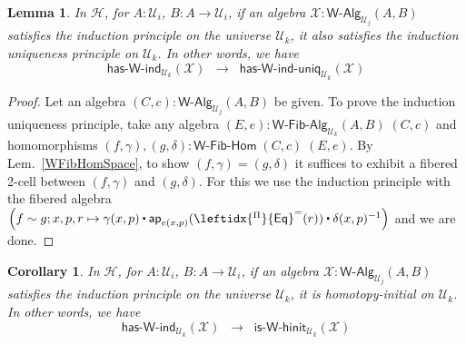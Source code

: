 \documentclass[reqno,10pt,a4paper,oneside]{amsart}
\newcommand{\X}{\mathcal{X}}
\newcommand{\W}{\mathsf{W}}
\newcommand{\funext}{\leftidx{^\Pi}{\mathsf{Eq}}^{=}}
\newcommand{\UU}{\mathcal{U}}
\newcommand{\WAlg}{\mathsf{W}\text{-}\mathsf{Alg}}
\newcommand{\WFibAlg}{\mathsf{W}\text{-}\mathsf{Fib}\text{-}\mathsf{Alg}}
\newcommand{\WFibHom}{\mathsf{W}\text{-}\mathsf{Fib}\text{-}\mathsf{Hom}}
\newcommand{\HasWRec}{\mathsf{has}\text{-}\mathsf{W}\text{-}\mathsf{rec}}
\newcommand{\HasWInd}{\mathsf{has}\text{-}\mathsf{W}\text{-}\mathsf{ind}}
\newcommand{\HasWRecUniq}{\mathsf{has}\text{-}\mathsf{W}\text{-}\mathsf{rec}\text{-}\mathsf{uniq}}
\newcommand{\HasWIndUniq}{\mathsf{has}\text{-}\mathsf{W}\text{-}\mathsf{ind}\text{-}\mathsf{uniq}}
\newcommand{\IsWHInit}{\mathsf{is}\text{-}\mathsf{\W}\text{-}\mathsf{hinit}}
\newcommand{\app}{\mathsf{ap}}
\newcommand{\Hint}{\mathcal{H}}
\newcommand{\ct}{%
  \mathchoice{\mathbin{\raisebox{0.5ex}{$\displaystyle\centerdot$}}}%
             {\mathbin{\raisebox{0.5ex}{$\centerdot$}}}%
             {\mathbin{\raisebox{0.25ex}{$\scriptstyle\,\centerdot\,$}}}%
             {\mathbin{\raisebox{0.1ex}{$\scriptscriptstyle\,\centerdot\,$}}}}
\numberwithin{equation}{section}
\theoremstyle{mythm}
\newtheorem{lemma}[theorem]{Lemma}
\newtheorem{corollary}[theorem]{Corollary}
\theoremstyle{mydef}
\theoremstyle{myrmk}
\begin{document}
\begin{lemma}\label{lem:WIndImpUniqInt}
In $\Hint$, for $A:\UU_i$, $B : A \to \UU_i$, if an algebra $\X : \WAlg_{\UU_j}(A,B)$ satisfies the induction principle on the universe $\UU_k$, it also satisfies the induction uniqueness principle on $\UU_k$. In other words, we have
\[ \HasWInd_{\UU_k}(\X) \;\; \rightarrow \;\; \HasWIndUniq_{\UU_k}(\X) \]
\end{lemma}
\begin{proof}
Let an algebra $(C,c) : \WAlg_{\UU_j}(A,B)$ be given. To prove the induction uniqueness principle, take any algebra $(E,e) : \WFibAlg_{\UU_k}(A,B) \; (C,c)$ and homomorphisms $(f,\gamma), (g,\delta) : \WFibHom \; (C,c) \; (E,e)$. By Lem.~\ref{WFibHomSpace}, to show $(f,\gamma) = (g,\delta)$ it suffices to exhibit a fibered 2-cell between $(f,\gamma)$ and $(g,\delta)$. For this we use the induction principle with the fibered algebra $\Big(f \sim g; x,p,r \mapsto \gamma(x,p) \ct \app_{e(x,p)}(\funext(r)) \ct \delta(x,p)^{-1}\Big)$ and we are done.
\end{proof}


\begin{corollary}\label{lem:WIndImpHInitInt}
In $\Hint$, for $A:\UU_i$, $B : A \to \UU_i$, if an algebra $\X : \WAlg_{\UU_j}(A,B)$ satisfies the induction principle on the universe $\UU_k$, it is homotopy-initial on $\UU_k$. In other words, we have
\[ \HasWInd_{\UU_k}(\X) \;\; \rightarrow \;\; \IsWHInit_{\UU_k}(\X) \]
\end{corollary}
\end{document}
